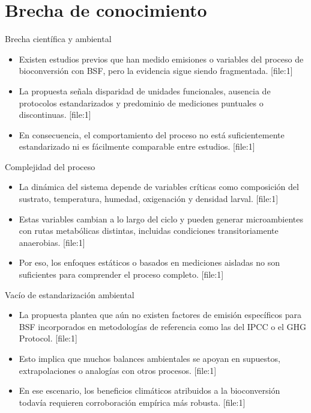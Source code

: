 \documentclass[10pt,aspectratio=169]{beamer}
\newcommand{\basecite}{\hfill{\color{griscita}\tiny [file:1]}}
\begin{document}
\section{Brecha de conocimiento}

\begin{frame}{Brecha científica y ambiental}
\justifying
\begin{itemize}
    \item Existen estudios previos que han medido emisiones o variables del proceso de bioconversión con BSF, pero la evidencia sigue siendo fragmentada. \basecite
    \item La propuesta señala disparidad de unidades funcionales, ausencia de protocolos estandarizados y predominio de mediciones puntuales o discontinuas. \basecite
    \item En consecuencia, el comportamiento del proceso no está suficientemente estandarizado ni es fácilmente comparable entre estudios. \basecite
\end{itemize}
\end{frame}

\begin{frame}{Complejidad del proceso}
\justifying
\begin{itemize}
    \item La dinámica del sistema depende de variables críticas como composición del sustrato, temperatura, humedad, oxigenación y densidad larval. \basecite
    \item Estas variables cambian a lo largo del ciclo y pueden generar microambientes con rutas metabólicas distintas, incluidas condiciones transitoriamente anaerobias. \basecite
    \item Por eso, los enfoques estáticos o basados en mediciones aisladas no son suficientes para comprender el proceso completo. \basecite
\end{itemize}
\end{frame}

\begin{frame}{Vacío de estandarización ambiental}
\justifying
\begin{itemize}
    \item La propuesta plantea que aún no existen factores de emisión específicos para BSF incorporados en metodologías de referencia como las del IPCC o el GHG Protocol. \basecite
    \item Esto implica que muchos balances ambientales se apoyan en supuestos, extrapolaciones o analogías con otros procesos. \basecite
    \item En ese escenario, los beneficios climáticos atribuidos a la bioconversión todavía requieren corroboración empírica más robusta. \basecite
\end{itemize}
\end{frame}
\end{document}
